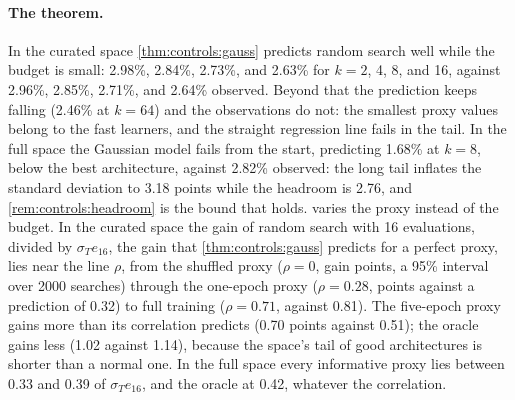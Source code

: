 \begin{refsection}
\paragraph{The theorem.} In the curated space \cref{thm:controls:gauss} predicts random search well while the budget is small: 2.98\%, 2.84\%, 2.73\%, and 2.63\% for $k=2$, 4, 8, and 16, against 2.96\%, 2.85\%, 2.71\%, and 2.64\% observed. Beyond that the prediction keeps falling (2.46\% at $k=64$) and the observations do not: the smallest proxy values belong to the fast learners, and the straight regression line fails in the tail. In the full space the Gaussian model fails from the start, predicting 1.68\% at $k=8$, below the best architecture, against 2.82\% observed: the long tail inflates the standard deviation to 3.18 points while the headroom is 2.76, and \cref{rem:controls:headroom} is the bound that holds.  varies the proxy instead of the budget. In the curated space the gain of random search with 16 evaluations, divided by $\sigma_Te_{16}$, the gain that \cref{thm:controls:gauss} predicts for a perfect proxy, lies near the line $\rho$, from the shuffled proxy ($\rho=0$, gain  points, a 95\% interval over 2000 searches) through the one-epoch proxy ($\rho=0.28$,  points against a prediction of 0.32) to full training ($\rho=0.71$,  against 0.81). The five-epoch proxy gains more than its correlation predicts (0.70 points against 0.51); the oracle gains less (1.02 against 1.14), because the space's tail of good architectures is shorter than a normal one. In the full space every informative proxy lies between 0.33 and 0.39 of $\sigma_Te_{16}$, and the oracle at 0.42, whatever the correlation.


\end{refsection}
